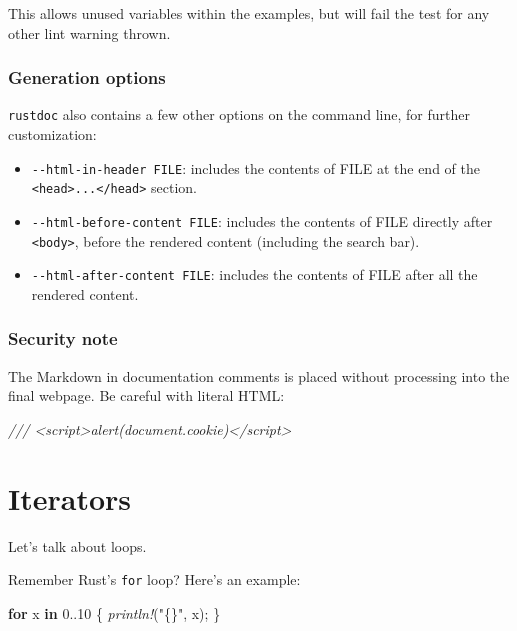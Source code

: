 \documentclass[a4paper,]{book}
\newenvironment{Shaded}{\begin{snugshade}}{\end{snugshade}}
\newcommand{\KeywordTok}[1]{\textcolor[rgb]{0.13,0.29,0.53}{\textbf{{#1}}}}
\newcommand{\DecValTok}[1]{\textcolor[rgb]{0.00,0.00,0.81}{{#1}}}
\newcommand{\StringTok}[1]{\textcolor[rgb]{0.31,0.60,0.02}{{#1}}}
\newcommand{\CommentTok}[1]{\textcolor[rgb]{0.56,0.35,0.01}{\textit{{#1}}}}
\newcommand{\PreprocessorTok}[1]{\textcolor[rgb]{0.56,0.35,0.01}{\textit{{#1}}}}
\newcommand{\NormalTok}[1]{{#1}}
\providecommand{\tightlist}{%
  \setlength{\itemsep}{0pt}\setlength{\parskip}{0pt}}
\begin{document}
This allows unused variables within the examples, but will fail the test
for any other lint warning thrown.

\subsubsection{Generation options}\label{generation-options}

\texttt{rustdoc} also contains a few other options on the command line,
for further customization:

\begin{itemize}
\tightlist
\item
  \texttt{-\/-html-in-header\ FILE}: includes the contents of FILE at
  the end of the
  \texttt{\textless{}head\textgreater{}...\textless{}/head\textgreater{}}
  section.
\item
  \texttt{-\/-html-before-content\ FILE}: includes the contents of FILE
  directly after \texttt{\textless{}body\textgreater{}}, before the
  rendered content (including the search bar).
\item
  \texttt{-\/-html-after-content\ FILE}: includes the contents of FILE
  after all the rendered content.
\end{itemize}

\subsubsection{Security note}\label{security-note}

The Markdown in documentation comments is placed without processing into
the final webpage. Be careful with literal HTML:

\begin{Shaded}
\begin{Highlighting}[]
\CommentTok{/// <script>alert(document.cookie)</script>}
\end{Highlighting}
\end{Shaded}

\hypertarget{sec--iterators}{\section{Iterators}\label{sec--iterators}}

Let's talk about loops.

Remember Rust's \texttt{for} loop? Here's an example:

\begin{Shaded}
\begin{Highlighting}[]
\KeywordTok{for} \NormalTok{x }\KeywordTok{in} \DecValTok{0.}\NormalTok{.}\DecValTok{10} \NormalTok{\{}
    \PreprocessorTok{println!}\NormalTok{(}\StringTok{"\{\}"}\NormalTok{, x);}
\NormalTok{\}}
\end{Highlighting}
\end{Shaded}
\end{document}
